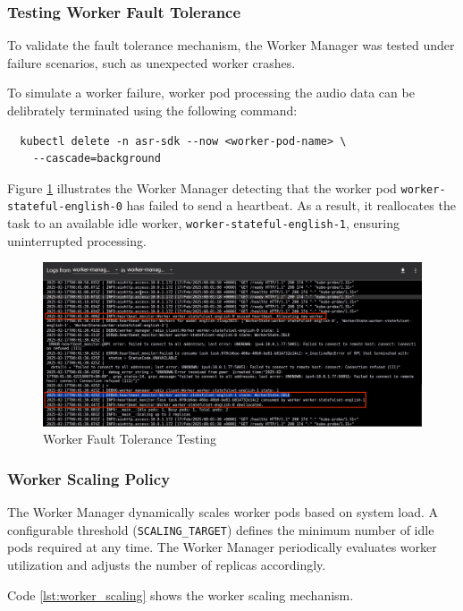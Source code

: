 \subsubsection{Testing Worker Fault Tolerance}
To validate the fault tolerance mechanism, the Worker Manager was tested under failure scenarios, such as unexpected worker crashes.

To simulate a worker failure, worker pod processing the audio data can be delibrately terminated using the following command:
\begin{verbatim}
  kubectl delete -n asr-sdk --now <worker-pod-name> \
    --cascade=background
\end{verbatim}

Figure \ref{fig:worker_fault_tolerance} illustrates the Worker Manager detecting that the worker pod \texttt{worker-\allowbreak stateful-english-0} has failed to send a heartbeat. As a result, it reallocates the task to an available idle worker, \texttt{worker-stateful-english-1}, ensuring uninterrupted processing.

\begin{figure}[ht]
  \centering
  \includegraphics[width=\textwidth]{figures/worker_fault_tolerance.png}
  \caption{Worker Fault Tolerance Testing}
  \label{fig:worker_fault_tolerance}
\end{figure}

\subsubsection{Worker Scaling Policy}
The Worker Manager dynamically scales worker pods based on system load. A configurable threshold (\texttt{SCALING\_TARGET}) defines the minimum number of idle pods required at any time. The Worker Manager periodically evaluates worker utilization and adjusts the number of replicas accordingly. 

Code \ref{lst:worker_scaling} shows the worker scaling mechanism.

